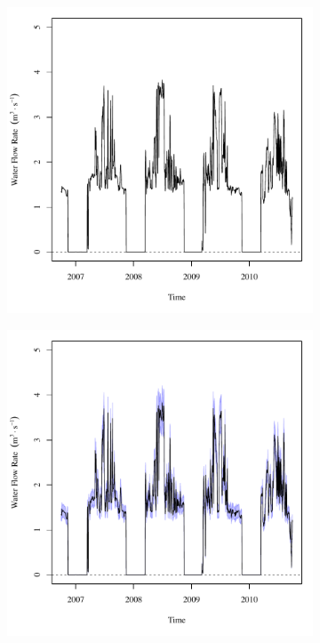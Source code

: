 \begin{linenumbers}
\begin{landscape}
\begin{figure}
\begin{subfigure}{0.7\textwidth}
			\includegraphics[width=\textwidth]{"Figures/Results_USR/Deterministic/Q CON"}
		\end{subfigure}%
		\begin{subfigure}{0.7\textwidth}
			\centering
			\includegraphics[width=\textwidth]{"Figures/Results_USR/Stochastic/Q CON"}

\end{subfigure}
\end{figure}
\end{landscape}
\end{linenumbers}
